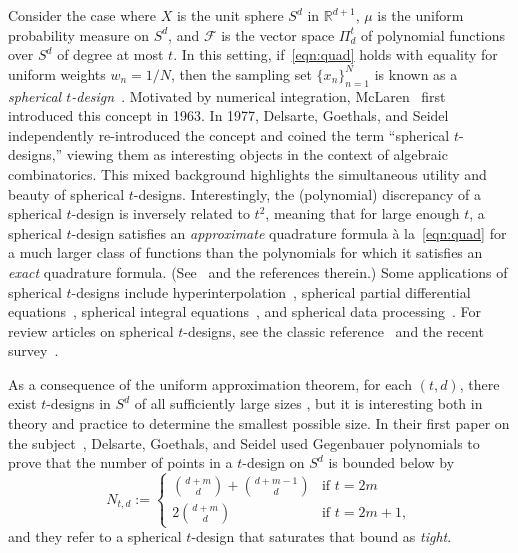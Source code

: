 \documentclass[12pt]{article}
\theoremstyle{plain}
\theoremstyle{definition}
\theoremstyle{remark}
\newcommand{\cF}{\mathcal{F}}
\begin{document}
Consider the case where $X$ is the unit sphere $S^d$ in $\mathbb{R}^{d+1}$, $\mu$ is the uniform probability measure on $S^d$, and $\cF$ is the vector space  $\Pi_d^t$ of polynomial functions over $S^d$ of degree at most $t$.
In this setting, if~\eqref{eqn:quad} holds with equality for uniform weights $w_n = 1/N$, then the sampling set $\{x_n\}_{n=1}^N$ is known as a \emph{spherical $t$-design}~\cite{McLaren:63,GoethalsS:79}.
Motivated by numerical integration, McLaren~\cite{McLaren:63} first introduced this concept in 1963.
In 1977, Delsarte, Goethals, and Seidel~\cite{DelsarteGS:77,GoethalsS:79} independently re-introduced the concept and coined the term ``spherical $t$-designs,'' viewing them as interesting objects in the context of algebraic combinatorics.
This mixed background highlights the simultaneous utility and beauty of spherical $t$-designs.
Interestingly, the (polynomial) discrepancy of a spherical $t$-design is inversely related to $t^2$, meaning that for large enough $t$, a spherical $t$-design satisfies an \textit{approximate} quadrature formula \`{a} la~\eqref{eqn:quad} for a much larger class of functions than the polynomials for which it satisfies an \textit{exact} quadrature formula.
(See~\cite{GrabnerKT:97} and the references therein.)
Some applications of spherical $t$-designs include hyperinterpolation~\cite{Sloan:95}, spherical partial differential equations~\cite{Wu:23}, spherical integral equations~\cite{AtkinsonB:87}, and spherical data processing~\cite{ChenW:18}.
For review articles on spherical $t$-designs, see the classic reference~\cite{Bannai:09} and the recent survey~\cite{AnZ:26}.

As a consequence of the uniform approximation theorem, for each $(t,d)$, there exist $t$-designs in $S^d$ of all sufficiently large sizes \cite{SeymourZ:84}, but it is interesting both in theory and practice to determine the smallest possible size.
In their first paper on the subject~\cite{DelsarteGS:77}, Delsarte, Goethals, and Seidel used Gegenbauer polynomials to prove that the number of points in a $t$-design on $S^d$ is bounded below by
\begin{equation}\label{eqn:dgsbd}
N_{t,d}
:=
\left\{
\begin{array}{cl}
\displaystyle
\binom{d+m}{d}+\binom{d+m-1}{d}
&\text{if } t=2m\\[8pt]
\displaystyle
2\binom{d+m}{d}
&\text{if } t=2m+1,
\end{array}\right.
\end{equation}
and they refer to a spherical $t$-design that saturates that bound as \emph{tight}.
\end{document}

